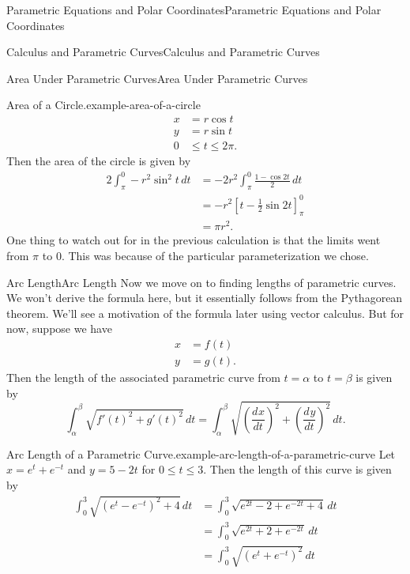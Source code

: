 \documentclass[10pt,]{book}
\numberwithin{equation}{section}
\newcommand{\dv}[3][]{\dfrac{d^{#1} #2}{d #3^{#1}}}
\begin{document}
\begin{chapterptx}{Parametric Equations and Polar Coordinates}{}{Parametric Equations and Polar Coordinates}{}{}
\begin{sectionptx}{Calculus and Parametric Curves}{}{Calculus and Parametric Curves}{}{}
\begin{subsectionptx}{Area Under Parametric Curves}{}{Area Under Parametric Curves}{}{}
\begin{example}{Area of a Circle.}{example-area-of-a-circle}
\begin{align*}
x & = r\cos t \\
y & = r\sin t \\
0 & \leq t\leq 2\pi. 
\end{align*}
\hypertarget{p-791}{}%
Then the area of the circle is given by%
%
\begin{align*}
2\int_{\pi}^{0} -r^{2}\sin^{2}t\,dt &= -2r^{2}\int_{\pi}^{0}\frac{1-\cos2t}{2}\,dt\\
& = -r^{2}\left[t-\frac{1}{2}\sin2t\right]_{\pi}^{0} \\
& = \pi r^{2}.
\end{align*}
\hypertarget{p-792}{}%
One thing to watch out for in the previous calculation is that the limits went from \(\pi\) to \(0\). This was because of the particular parameterization we chose.%
\end{example}
\end{subsectionptx}
%
%
\typeout{************************************************}
\typeout{************************************************}
%
\begin{subsectionptx}{Arc Length}{}{Arc Length}{}{}\label{subsection-arc-length}
\hypertarget{p-793}{}%
Now we move on to finding lengths of parametric curves. We won't derive the formula here, but it essentially follows from the Pythagorean theorem. We'll see a motivation of the formula later using vector calculus. But for now, suppose we have%
%
\begin{align*}
x & = f(t) \\
y & = g(t). 
\end{align*}
\hypertarget{p-794}{}%
Then the length of the associated parametric curve from \(t=\alpha\) to \(t=\beta\) is given by%
%
\begin{equation*}
\int_{\alpha}^{\beta} \sqrt{f'(t)^{2}+g'(t)^{2}}\,dt = \int_{\alpha}^{\beta}\sqrt{\left(\dv{x}{t}\right)^{2} + \left(\dv{y}{t}\right)^{2}}\,dt.
\end{equation*}
\begin{example}{Arc Length of a Parametric Curve.}{example-arc-length-of-a-parametric-curve}%
\hypertarget{p-795}{}%
Let \(x = e^{t}+e^{-t}\) and \(y = 5-2t\) for \(0\leq t\leq 3.\) Then the length of this curve is given by%
%
\begin{align*}
\int_{0}^{3}\sqrt{(e^{t}-e^{-t})^{2} + 4}\,dt & = \int_{0}^{3}\sqrt{e^{2t}-2 + e^{-2t} + 4}\,dt \\
& = \int_{0}^{3}\sqrt{e^{2t} + 2 + e^{-2t}}\,dt \\
& = \int_{0}^{3}\sqrt{(e^{t}+e^{-t})^{2}}\,dt \\

\end{align*}
\end{example}
\end{subsectionptx}
\end{sectionptx}
\end{chapterptx}
\end{document}
